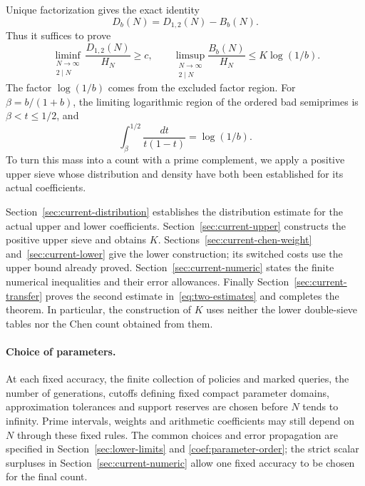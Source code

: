 Unique factorization gives the exact identity
\begin{equation}
                 D_b(N)=D_{1,2}(N)-B_b(N).
                 \label{eq:reduction}
\end{equation}
Thus it suffices to prove
\begin{equation}
 \liminf_{\substack{N\to\infty\\2\mid N}}
       \frac{D_{1,2}(N)}{H_N}\ge c,
 \qquad
 \limsup_{\substack{N\to\infty\\2\mid N}}
       \frac{B_b(N)}{H_N}\le K\log(1/b).
 \label{eq:two-estimates}
\end{equation}
The factor $\log(1/b)$ comes from the excluded factor region. For
$\beta=b/(1+b)$, the limiting logarithmic region of the ordered bad
semiprimes is $\beta<t\le1/2$, and
\[
 \int_\beta^{1/2}\frac{dt}{t(1-t)}=\log(1/b).
\]
To turn this mass into a count with a prime complement, we apply a
positive upper sieve whose distribution and density have both been
established for its actual coefficients.

Section~\ref{sec:current-distribution}
establishes the distribution estimate for the actual upper and lower
coefficients. Section~\ref{sec:current-upper} constructs the positive
upper sieve and obtains $K$. Sections~\ref{sec:current-chen-weight}
and~\ref{sec:current-lower} give the lower construction; its switched
costs use the upper bound already proved. Section~\ref{sec:current-numeric}
states the finite numerical inequalities and their error allowances.
Finally Section~\ref{sec:current-transfer} proves the second estimate
in~\eqref{eq:two-estimates} and completes the theorem. In particular,
the construction of $K$ uses neither the lower double-sieve tables nor
the Chen count obtained from them.

\paragraph{Choice of parameters.}
At each fixed accuracy, the finite collection of policies and marked queries,
the number of generations, cutoffs defining fixed compact parameter domains,
approximation tolerances and
support reserves are chosen before $N$ tends to infinity. Prime intervals,
weights and arithmetic coefficients may still depend on $N$ through these
fixed rules. The common choices and error propagation are specified in
Section~\ref{sec:lower-limits} and \eqref{coef:parameter-order}; the strict
scalar surpluses in Section~\ref{sec:current-numeric} allow one fixed accuracy
to be chosen for the final count.

